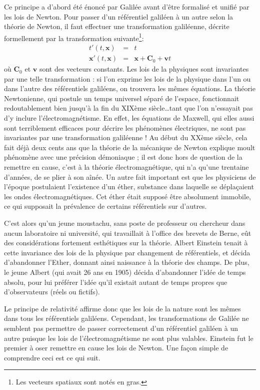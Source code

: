		Ce principe a d'abord été énoncé par Galilée avant d'être formalisé et unifié par les lois de Newton. Pour passer d'un référentiel galiléen à un autre selon la théorie de Newton, il faut effectuer une transformation galiléenne, décrite formellement par la transformation suivante\footnote{Les vecteurs spatiaux sont notés en gras.}:
		\begin{eqnarray}
			t'(t,\bm{x})&=&t \\
			\bm{x}'(t,\bm{x})&=&\bm{x}+\bm{C}_0+\bm{v}t
		\end{eqnarray}
		où $\bm{C}_0$ et $\bm{v}$ sont des vecteurs constants. Les lois de la physiques sont invariantes par une telle transformation : si l'on exprime les lois de la physique dans l'un ou dans l'autre des référentiels galiléens, on trouvera les mêmes équations. La théorie Newtonienne, qui postule un temps universel séparé de l'espace, fonctionnait redoutablement bien jusqu'à la fin du XIXème siècle\ldots tant que l'on n'essayait pas d'y inclure l'électromagnétisme. En effet, les équations de Maxwell, qui elles aussi sont terriblement efficaces pour décrire les phénomènes électriques, ne sont pas invariantes par une transformation galiléenne ! Au début du XXème siècle, cela fait déjà deux cents ans que la théorie de la mécanique de Newton explique moult phénomène avec une précision démoniaque ; il est donc hors de question de la remettre en cause, c'est à la théorie électromagnétique, qui n'a qu'une trentaine d'années, de se plier à son aînée. Un autre fait important est que les physiciens de l'époque postulaient l'existence d'un éther, substance dans laquelle se déplaçaient les ondes électromagnétiques. Cet éther était supposé être absolument immobile, ce qui supposait la prévalence de certains référentiels sur d'autres. 

		C'est alors qu'un jeune moustachu, sans poste de professeur ou chercheur dans aucun laboratoire ni université, qui travaillait à l'office des brevets de Berne, eût des considérations fortement esthétiques sur la théorie. Albert Einstein tenait à cette invariance des lois de la physique par changement de référentiels, et décida d'abandonner l'Ether, donnant ainsi naissance à la théorie des champs. De plus, le jeune Albert (qui avait 26 ans en 1905) décida d'abandonner l'idée de temps absolu, pour lui préférer l'idée qu'il existait autant de temps propres que d'observateurs (réels ou fictifs).

		Le principe de relativité affirme donc que les lois de la nature sont les mêmes dans tous les référentiels galiléens. Cependant, les transformations de Galilée ne semblent pas permettre de passer correctement d'un référentiel galiléen à un autre puisque les lois de l'électromagnétisme ne sont plus valables. Einstein fut le premier à oser remettre en cause les lois de Newton. Une façon simple de comprendre ceci est ce qui suit.

